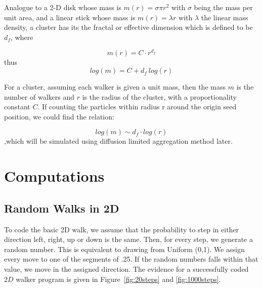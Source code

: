 \documentclass[12pt]{article}
\begin{document}
Analogue to a 2-D disk whose mass is $m(r)=\sigma \pi r^2$ with $\sigma$ being the mass per unit area, and a linear stick whose mass is $m(r)=\lambda r$ with $\lambda$ the linear mass density, a cluster has its the fractal or effective dimension which is defined to be $d_f$, where

\begin{equation}
  \label{eq:fractaldimension1}
     m(r)=C\cdot r^{d_f}
\end{equation}
thus
\begin{equation}
  \label{eq:fractaldimension2}
     log(m)=C+d_f\ log(r)
\end{equation}

For a cluster, assuming each walker is given a unit mass, then the mass $m$ is the number of walkers and $r$ is the radius of the cluster, with a proportionality constant $C$. If counting the particles within radius r around the origin seed position, we could find the relation:

\begin{equation}
  \label{eq:fractaldimension3}
     log(m) \sim d_f \cdot log(r)
\end{equation}
,which will be simulated using diffusion limited aggregation method later.


\section{Computations}
\label{sec:computations}

\subsection{Random Walks in 2D}
\label{sec:computationsRandomWalk}
To code the basic 2D walk, we assume that the probability to step in either direction left, right, up or down is the same. Then, for every step, we generate a random number. This is equivalent to drawing from Uniform (0,1). We assign every move to one of the segments of .25. If the random numbers falls within that value, we move in the assigned direction. The evidence for a successfully coded $2D$ walker program is given in Figure~\ref{fig:20steps} and \ref{fig:1000steps}.
\end{document}
